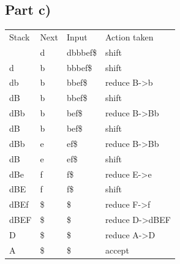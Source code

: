 \documentclass[paper=a4, fontsize=11pt]{scrartcl} %
\numberwithin{equation}{section} %
\numberwithin{figure}{section} %
\numberwithin{table}{section} %
\begin{document}
\subsection{Part c)}
\begin{center}
    \begin{tabular}{ | l | l | l | l | }
    \hline
    Stack       & Next              & Input         & Action taken          \\
    \hhline{|=|=|=|=|}
                & d                 & dbbbef\$      & shift                 \\
    \hline
    d           & b                 & bbbef\$       & shift                 \\
    \hline
    db          & b                 & bbef\$        & reduce B->b           \\
    \hline
    dB          & b                 & bbef\$        & shift                 \\
    \hline
    dBb         & b                 & bef\$         & reduce B->Bb          \\
    \hline
    dB          & b                 & bef\$         & shift                 \\
    \hline
    dBb         & e                 & ef\$          & reduce B->Bb          \\
    \hline
    dB          & e                 & ef\$          & shift                 \\
    \hline
    dBe         & f                 & f\$           & reduce E->e           \\
    \hline
    dBE         & f                 & f\$           & shift                 \\
    \hline
    dBEf        & \$                & \$            & reduce F->f           \\
    \hline
    dBEF        & \$                & \$            & reduce D->dBEF        \\
    \hline
    D           & \$                & \$            & reduce A->D           \\
    \hline
    A           & \$                & \$            & accept                \\
    \hline
    \end{tabular}
\end{center}
\end{document}
